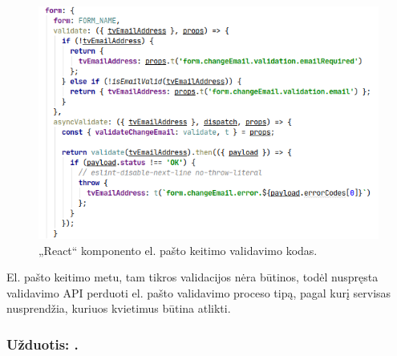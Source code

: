\begin{figure}[H]
    \centering
    \includegraphics[scale=0.7]{img/email-validate.png}
    \caption{„React“ komponento el. pašto keitimo validavimo kodas.}
    \label{img:email-validate}
\end{figure}

El. pašto keitimo metu, tam tikros validacijos nėra būtinos, todėl nuspręsta validavimo API perduoti el. pašto validavimo proceso tipą, pagal kurį servisas nusprendžia,
kuriuos kvietimus būtina atlikti.


\subsubsection{Užduotis: .}